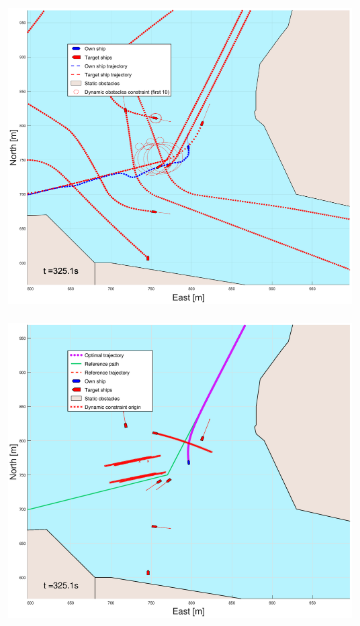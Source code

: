 \begin{figure}[ht]
\begin{subfigure}[b]{0.499\textwidth}
    \end{subfigure}
    \hfill
    \\
    \begin{subfigure}[b]{0.49\textwidth}
        \centering
        \includegraphics[width=\textwidth]{Images/Figures/Trheimfjord/_Simple_0fig1_time=325}
    \end{subfigure}
    \hfill
    \begin{subfigure}[b]{0.499\textwidth}
        \centering
        \includegraphics[width=\textwidth]{Images/Figures/Trheimfjord/_Simple_0fig999_time=325}

\end{subfigure}
\end{figure}
